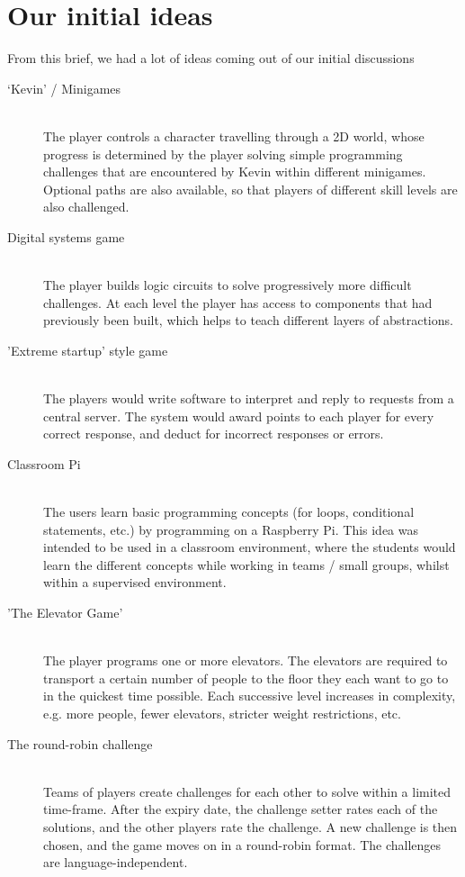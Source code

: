 \documentclass{report}
\begin{document}
\section{Our initial ideas}
From this brief, we had a lot of ideas coming out of our initial discussions
\begin{description}
\item[‘Kevin’ / Minigames] \hfill \\ The player controls a character travelling through a 2D world, whose progress is
determined by the player solving simple programming challenges that are encountered by Kevin within different minigames. Optional paths are also available, so that players of different skill levels are also challenged.
\item[Digital systems game] \hfill \\The player builds logic circuits to solve progressively more difficult challenges. At each level the player has access to components that had previously been built, which helps to teach different layers of abstractions.
\item['Extreme startup' style game] \hfill \\The players would write software to interpret and reply to requests from a central server. The system would award points to each player for every correct response, and deduct for incorrect responses or errors.
\item[Classroom Pi] \hfill \\The users learn basic programming concepts (for loops, conditional statements, etc.) by programming on a Raspberry Pi. This idea was intended to be used in a classroom environment, where the students would learn the different concepts while working in teams / small groups, whilst within a supervised environment.
\item['The Elevator Game'] \hfill \\The player programs one or more elevators. The elevators are required to transport a certain number of people to the floor they each want to go to in the quickest time possible. Each successive level increases in complexity, e.g. more people, fewer elevators, stricter weight restrictions, etc.
\item[The round-robin challenge] \hfill \\Teams of players create challenges for each other to solve within a limited time-frame. After the expiry date, the challenge setter rates each of the solutions, and the other players rate the challenge. A new challenge is then chosen, and the game moves on in a round-robin format. The challenges are language-independent.
\end{description}
\end{document}

